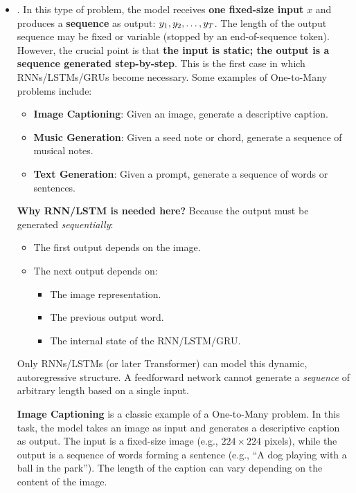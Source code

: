 \begin{itemize}
    \item[\textcolor{Red3}{\faIcon{book}}] . In this type of problem, the model receives \textbf{one fixed-size input} $x$ and produces a \textbf{sequence} as output: $y_1, y_2, \ldots,\break y_T$. The length of the output sequence may be fixed or variable (stopped by an end-of-sequence token). However, the crucial point is that \textbf{the input is static; the output is a sequence generated step-by-step}. This is the first case in which RNNs/LSTMs/GRUs become necessary. Some examples of One-to-Many problems include:
    \begin{itemize}
        \item \textbf{Image Captioning}: Given an image, generate a descriptive caption.
        \item \textbf{Music Generation}: Given a seed note or chord, generate a sequence of musical notes.
        \item \textbf{Text Generation}: Given a prompt, generate a sequence of words or sentences.
    \end{itemize}
    \textcolor{Green3}{ \textbf{Why RNN/LSTM is needed here?}} Because the output must be generated \emph{sequentially}:
    \begin{itemize}
        \item The first output depends on the image.
        \item The next output depends on:
        \begin{itemize}
            \item The image representation.
            \item The previous output word.
            \item The internal state of the RNN/LSTM/GRU.
        \end{itemize}
    \end{itemize}
    Only RNNs/LSTMs (or later Transformer) can model this dynamic, autoregressive structure. A feedforward network cannot generate a \emph{sequence} of arbitrary length based on a single input.

    \begin{examplebox}
        \textbf{Image Captioning} is a classic example of a One-to-Many problem. In this task, the model takes an image as input and generates a descriptive caption as output. The input is a fixed-size image (e.g., $224 \times 224$ pixels), while the output is a sequence of words forming a sentence (e.g., ``A dog playing with a ball in the park''). The length of the caption can vary depending on the content of the image.


\end{examplebox}
\end{itemize}
